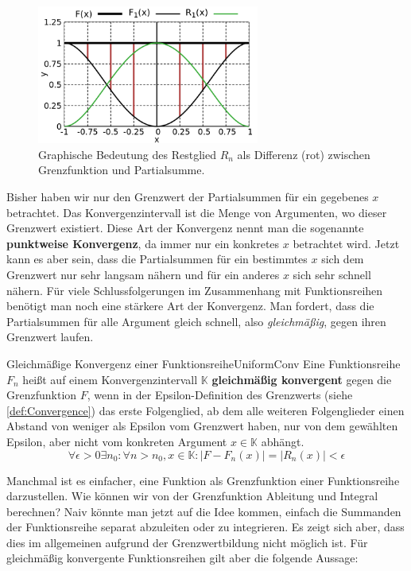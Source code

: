 \begin{figure}
    \centering
    \includegraphics[width=0.65\textwidth]{./gnuplot/function-sum-error-term}
    \caption{Graphische Bedeutung des Restglied $R_n$ als Differenz (rot) zwischen Grenzfunktion und Partialsumme.}
    \label{fig:ExFunErrTerm}
\end{figure}

Bisher haben wir nur den Grenzwert der Partialsummen für ein gegebenes $x$ betrachtet. Das Konvergenzintervall ist die Menge von Argumenten, wo dieser Grenzwert existiert. Diese Art der Konvergenz nennt man die sogenannte \textbf{punktweise Konvergenz}, da immer nur ein konkretes $x$ betrachtet wird. Jetzt kann es aber sein, dass die Partialsummen für ein bestimmtes $x$ sich dem Grenzwert nur sehr langsam nähern und für ein anderes $x$ sich sehr schnell nähern. Für viele Schlussfolgerungen im Zusammenhang mit Funktionsreihen benötigt man noch eine stärkere Art der Konvergenz. Man fordert, dass die Partialsummen für alle Argument gleich schnell, also \emph{gleichmäßig}, gegen ihren Grenzwert laufen.

\begin{definition}{Gleichmäßige Konvergenz einer Funktionsreihe}{UniformConv}
    Eine Funktionsreihe $F_n$ heißt auf einem Konvergenzintervall $\mathbb{K}$ \textbf{gleichmäßig konvergent} gegen die Grenzfunktion $F$, wenn in der Epsilon-Definition des Grenzwerts (siehe \ref{def:Convergence}) das erste Folgenglied, ab dem alle weiteren Folgenglieder einen Abstand von weniger als Epsilon vom Grenzwert haben, nur von dem gewählten Epsilon, aber nicht vom konkreten Argument $x\in\mathbb{K}$ abhängt.
    $$
        \forall \epsilon > 0 \exists n_0: \forall n > n_0, x \in \mathbb{K}: |F-F_n(x)| = |R_n(x)| < \epsilon
    $$
\end{definition}

Manchmal ist es einfacher, eine Funktion als Grenzfunktion einer Funktionsreihe darzustellen. Wie können wir von der Grenzfunktion Ableitung und Integral berechnen? Naiv könnte man jetzt auf die Idee kommen, einfach die Summanden der Funktionsreihe separat abzuleiten oder zu integrieren. Es zeigt sich aber, dass dies im allgemeinen aufgrund der Grenzwertbildung nicht möglich ist. Für gleichmäßig konvergente Funktionsreihen gilt aber die folgende Aussage:

